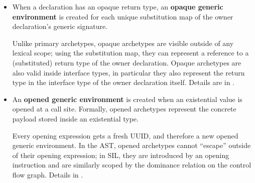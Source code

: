 \documentclass[../generics]{subfiles}
\begin{document}
\begin{itemize}
\item When a declaration has an opaque return type, an \textbf{opaque generic environment} is created for each unique substitution map of the owner declaration's generic signature.
\begin{quote}
\end{quote}
Unlike primary archetypes, opaque archetypes are visible outside of any lexical scope; using the substitution map, they can represent a reference to a (substituted) return type of the owner declaration. Opaque archetypes are also valid inside interface types, in particular they also represent the return type in the interface type of the owner declaration itself. Details are in .
\item An \textbf{opened generic environment} is created when an existential value is opened at a call site. Formally, opened archetypes represent the concrete payload stored inside an existential type.
\begin{quote}
\end{quote}
Every opening expression gets a fresh UUID, and therefore a new opened generic environment. In the AST, opened archetypes cannot ``escape'' outside of their opening expression; in SIL, they are introduced by an opening instruction and are similarly scoped by the dominance relation on the control flow graph. Details in .
\end{itemize}
\end{document}
